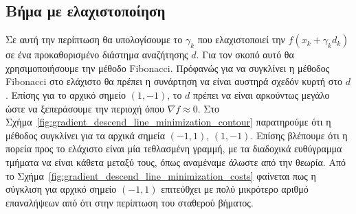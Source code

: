 \documentclass[a4paper,12pt]{article}
\begin{document}
\subsection*{Βήμα με ελαχιστοποίηση}
Σε αυτή την περίπτωση θα υπολογίσουμε το $\gamma_k$ που ελαχιστοποιεί την $f(x_k + \gamma_k d_k)$ σε ένα προκαθορισμένο
διάστημα αναζήτησης $d$. Για τον σκοπό αυτό θα χρησιμοποιήσουμε την μέθοδο  Fibonacci.
 Πρόφανώς για να συγκλίνει η μέθοδος  Fibonacci  
στο ελάχιστο θα πρέπει η συνάρτηση να είναι αυστηρά σχεδόν κυρτή στο $d$. Επίσης για το αρχικό σημείο $(1, -1)$, 
το $d$ πρέπει να είναι αρκούντως μεγάλο ώστε να ξεπεράσουμε την περιοχή όπου $\nabla f \approx 0$. Στο 
Σχήμα~\ref{fig:gradient_descend_line_minimization_contour}
παρατηρούμε ότι η μέθοδος συγκλίνει για τα αρχικά σημεία $(-1, 1)$, $(1, -1)$. Επίσης βλέπουμε ότι η πορεία προς το 
ελάχιστο είναι μία τεθλασμένη γραμμή, με τα διαδοχικά ευθύγραμμα τμήματα να είναι κάθετα μεταξύ τους, όπως αναμέναμε
άλωστε από την θεωρία. Από το Σχήμα~\ref{fig:gradient_descend_line_minimization_costs} φαίνεται πως η σύγκλιση για 
αρχικό σημείο $(-1, 1)$ επιτεύθχει με πολύ μικρότερο αριθμό επαναλήψεων από ότι στην περίπτωση του σταθερού βήματος.
\end{document}
